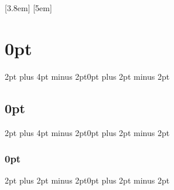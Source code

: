 \setlength\columnsep{5mm}
\setlength{\parindent}{0mm}
\setlength{\parskip}{1.5mm plus1mm minus1mm}

\setcounter{tocdepth}{2}
[3.8em]
{\vspace{-.3em}}
{\contentslabel{2.3em}}
{\hspace*{-2.3em}}
{\contentspage}
[5em]
{\vspace{-.3em}}
{\contentslabel{2.3em}}
{\hspace*{-2.3em}}
{\contentspage}

\titlespacing\section{0pt}{2pt plus 4pt minus 2pt}{0pt plus 2pt minus 2pt}
\titlespacing\subsection{0pt}{2pt plus 4pt minus 2pt}{0pt plus 2pt minus 2pt}
\titlespacing\subsubsection{0pt}{2pt plus 2pt minus 2pt}{0pt plus 2pt minus 2pt}

\pagestyle{fancy}
\lhead[]{}
\chead{}
\rhead[]{}
\rfoot[]{{\sffamily\centering \textbf{\thepage}}}
\cfoot{}
\lfoot[{\sffamily \thepage}]{}
\renewcommand{\headrulewidth}{0.0pt}
\renewcommand{\footrulewidth}{0.0pt}

\fancypagestyle{plain}{
	\fancyhf{}
	\fancyfoot[LE,RO]{{\sffamily \thepage}}
	\renewcommand{\headrulewidth}{0pt}
	\renewcommand{\footrulewidth}{0.2pt}
}


\usepackage{amsmath}
\usepackage{amsfonts}
\usepackage{amssymb}
\usepackage{bm}

\newcommand{\fm}{\texttt{fastmat}}
\newcommand{\np}{\texttt{numpy}}
\newcommand{\scip}{\texttt{scipy}}

